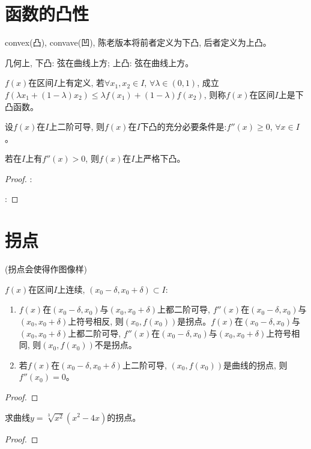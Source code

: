 \section{函数的凸性}
convex(凸), convave(凹), 陈老版本将前者定义为下凸, 后者定义为上凸。

几何上, 下凸: 弦在曲线上方; 上凸: 弦在曲线上方。

\begin{definition}
    $f(x)$在区间$I$上有定义, 若$\forall x_1, x_2 \in I$, $\forall \lambda \in (0, 1)$, 成立$f(\lambda x_1 + (1-\lambda)x_2) \le \lambda f(x_1) + (1-\lambda)f(x_2)$, 则称$f(x)$在区间$I$上是下凸函数。
\end{definition}

\begin{theorem}[二阶导数与凸性的关系]
    设$f(x)$在$I$上二阶可导, 则$f(x)$在$I$下凸的充分必要条件是:$f''(x)\ge 0$, $\forall x \in I$。

    若在$I$上有$f''(x) > 0$, 则$f(x)$在$I$上严格下凸。
\end{theorem}
\begin{proof}
    :

    :
\end{proof}

\section{拐点}
(拐点会使得作图像样)
\begin{theorem}
    $f(x)$在区间$I$上连续, $(x_0-\delta, x_0+\delta) \subset I$:
    \begin{enumerate}
        \item $f(x)$在$(x_0-\delta, x_0)$与$(x_0, x_0+\delta)$上都二阶可导, $f''(x)$在$(x_0-\delta, x_0)$与$(x_0, x_0+\delta)$上符号相反, 则$(x_0, f(x_0))$是拐点。$f(x)$在$(x_0-\delta, x_0)$与$(x_0, x_0+\delta)$上都二阶可导, $f''(x)$在$(x_0-\delta, x_0)$与$(x_0, x_0+\delta)$上符号相同, 则$(x_0, f(x_0))$不是拐点。
        \item 若$f(x)$在$(x_0-\delta, x_0+\delta)$上二阶可导, $(x_0, f(x_0))$是曲线的拐点, 则$f''(x_0) = 0$。
    \end{enumerate}
\end{theorem}
\begin{proof}
    
\end{proof}

\begin{example}
    求曲线$y = \sqrt[3]{x^2}(x^2-4x)$的拐点。
\end{example}
\begin{proof}
    
\end{proof}

